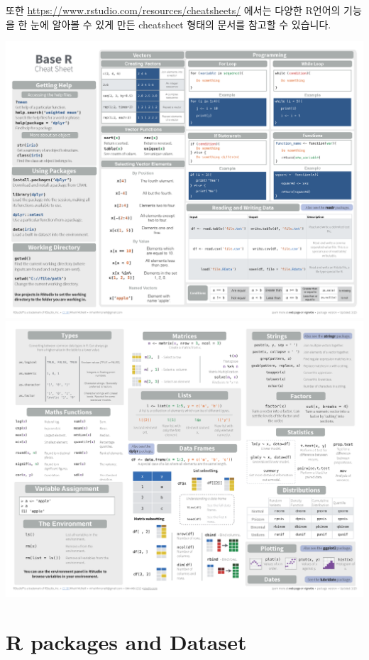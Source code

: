 \documentclass[
]{book}
\begin{document}
또한 \url{https://www.rstudio.com/resources/cheatsheets/} 에서는 다양한 R언어의 기능을 한 눈에 알아볼 수 있게 만든 cheatsheet 형태의 문서를 참고할 수 있습니다.

\includegraphics[width=5.72917in,height=\textheight]{images/01/base-r_1.png}
\includegraphics[width=5.72917in,height=\textheight]{images/01/base-r_2.png}

\hypertarget{r-packages-and-dataset}{%
\section{R packages and Dataset}\label{r-packages-and-dataset}}
\end{document}
